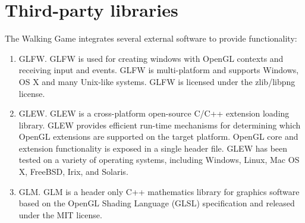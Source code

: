 \documentclass[12pt,letterpaper]{article}
\begin{document}
	\section{Third-party libraries}
	The Walking Game integrates several external software to provide functionality:
	\begin{enumerate}
		\item GLFW. GLFW is used for creating windows with OpenGL contexts and receiving input and events. GLFW is multi-platform and supports Windows, OS X and many Unix-like systems. GLFW is licensed under the zlib/libpng license.
		
		\item GLEW. GLEW is a cross-platform open-source C/C++ extension loading library. GLEW provides efficient run-time mechanisms for determining which OpenGL extensions are supported on the target platform. OpenGL core and extension functionality is exposed in a single header file. GLEW has been tested on a variety of operating systems, including Windows, Linux, Mac OS X, FreeBSD, Irix, and Solaris.
		
		\item GLM. GLM is a header only C++ mathematics library for graphics software based on the OpenGL Shading Language (GLSL) specification and released under the MIT license.
	\end{enumerate}
	
	\hypertarget{appendixa}{}
\end{document}
